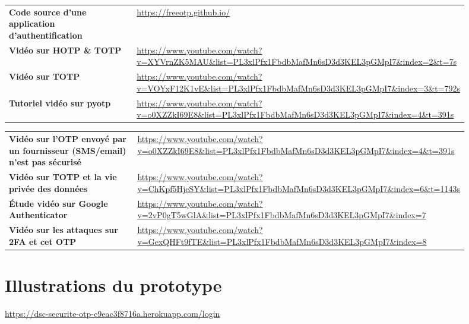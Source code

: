 \documentclass[a4paper, 10pt]{article}
\newcommand{\otp}{\textsc{OTP} }
\newcommand{\totp}{\textsc{TOTP} }
\newcommand{\hotp}{\textsc{HOTP} }
\begin{document}
\begin{tabular}{p{0.5\linewidth}p{0.4\linewidth}}
   \textbf{Code source d'une application d'authentification} & \url{https://freeotp.github.io/} \\
   
   \textbf{Vidéo sur \hotp \& \totp} & \url{https://www.youtube.com/watch?v=XYVrnZK5MAU&list=PL3xlPfx1FbdbMafMn6sD3d3KEL3pGMpI7&index=2&t=7s} \\
   
   \textbf{Vidéo sur \totp} & \url{https://www.youtube.com/watch?v=VOYxF12K1vE&list=PL3xlPfx1FbdbMafMn6sD3d3KEL3pGMpI7&index=3&t=792s} \\
   
   \textbf{Tutoriel vidéo sur pyotp} & \url{https://www.youtube.com/watch?v=o0XZZkI69E8&list=PL3xlPfx1FbdbMafMn6sD3d3KEL3pGMpI7&index=4&t=391s} \\
   
   
\end{tabular}

\begin{tabular}{p{0.5\linewidth}p{0.4\linewidth}}
    \textbf{Vidéo sur l'\otp envoyé par un fournisseur (SMS/email) n'est pas sécurisé} & \url{https://www.youtube.com/watch?v=o0XZZkI69E8&list=PL3xlPfx1FbdbMafMn6sD3d3KEL3pGMpI7&index=4&t=391s} \\
     \textbf{Vidéo sur TOTP et la vie privée des données} & \url{https://www.youtube.com/watch?v=ChKpf5HjcSY&list=PL3xlPfx1FbdbMafMn6sD3d3KEL3pGMpI7&index=6&t=1143s} \\
   
   \textbf{Étude vidéo sur Google Authenticator} & \url{https://www.youtube.com/watch?v=2vP0gT5wGlA&list=PL3xlPfx1FbdbMafMn6sD3d3KEL3pGMpI7&index=7} \\
   
   \textbf{Vidéo sur les attaques sur 2FA et cet \otp} & \url{https://www.youtube.com/watch?v=GexQHFt9fTE&list=PL3xlPfx1FbdbMafMn6sD3d3KEL3pGMpI7&index=8} \\
\end{tabular}

\restoregeometry


\newpage

    \section{Illustrations du prototype}\label{ann:app}

\url{https://dsc-securite-otp-c9eac3f8716a.herokuapp.com/login}
\end{document}
